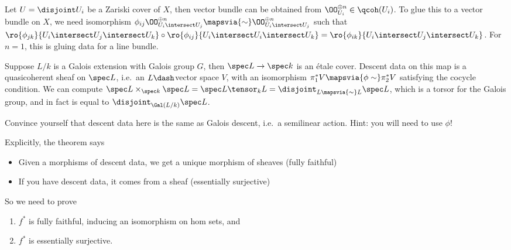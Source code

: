 \begin{example}[?]

Let \(U = \disjoint U_i\) be a Zariski cover of \(X\), then vector
bundle can be obtained from \(\OO_{U_i}^{\oplus n}\in \qcoh(U_i)\). To
glue this to a vector bundle on \(X\), we need isomorphism
\(\phi_{ij} \OO_{U_i\intersect U_j}^{\oplus n} \mapsvia{\sim } \OO_{U_i\intersect U_j}^{\oplus n}\)
such that
\(\ro{\phi_{jk}}{U_i \intersect U_j \intersect U_k} \circ \ro{\phi_{ij}}{U_i \intersect U_i \intersect U_k} = \ro{\phi_{ik}}{U_i\intersect U_j \intersect U_k}\).
For \(n=1\), this is gluing data for a line bundle.

\end{example}

\begin{example}[?]

Suppose \(L/k\) is a Galois extension with Galois group \(G\), then
\(\spec L \to \spec k\) is an étale cover. Descent data on this map is a
quasicoherent sheaf on \(\spec L\), i.e.~an \(L\dash\)vector space
\(V\), with an isomorphism \(\pi_1^* V \mapsvia{\phi \sim}\pi_2^* V\)
satisfying the cocycle condition. We can compute
\(\spec L \times_{\spec k} \spec L = \spec L\tensor_k L = \disjoint_{L\mapsvia{\sim} L} \spec L\),
which is a torsor for the Galois group, and in fact is equal to
\(\disjoint_{\Gal(L/k)} \spec L\).

\end{example}

\begin{exercise}[?]

Convince yourself that descent data here is the same as Galois descent,
i.e.~a semilinear action. Hint: you will need to use \(\phi\)!

\end{exercise}

Explicitly, the theorem says

\begin{itemize}
\item
  Given a morphisms of descent data, we get a unique morphism of sheaves
  (fully faithful)
\item
  If you have descent data, it comes from a sheaf (essentially
  surjective)
\end{itemize}

So we need to prove

\begin{enumerate}
\def\labelenumi{\arabic{enumi}.}
\item
  \(f^*\) is fully faithful, inducing an isomorphism on hom sets, and
\item
  \(f^*\) is essentially surjective.
\end{enumerate}

